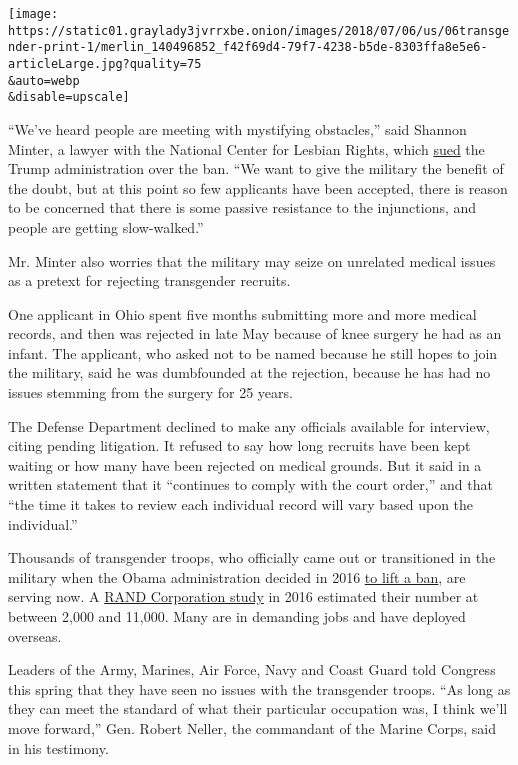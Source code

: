 \texttt{[image: https://static01.graylady3jvrrxbe.onion/images/2018/07/06/us/06transgender-print-1/merlin\_140496852\_f42f69d4-79f7-4238-b5de-8303ffa8e5e6-articleLarge.jpg?quality=75\\\&auto=webp\\\&disable=upscale]}

``We've heard people are meeting with mystifying obstacles,'' said
Shannon Minter, a lawyer with the National Center for Lesbian Rights,
which
\href{https://www.nytimes3xbfgragh.onion/2017/10/30/us/military-transgender-ban.html}{sued}
the Trump administration over the ban. ``We want to give the military
the benefit of the doubt, but at this point so few applicants have been
accepted, there is reason to be concerned that there is some passive
resistance to the injunctions, and people are getting slow-walked.''

Mr. Minter also worries that the military may seize on unrelated medical
issues as a pretext for rejecting transgender recruits.

One applicant in Ohio spent five months submitting more and more medical
records, and then was rejected in late May because of knee surgery he
had as an infant. The applicant, who asked not to be named because he
still hopes to join the military, said he was dumbfounded at the
rejection, because he has had no issues stemming from the surgery for 25
years.

The Defense Department declined to make any officials available for
interview, citing pending litigation. It refused to say how long
recruits have been kept waiting or how many have been rejected on
medical grounds. But it said in a written statement that it ``continues
to comply with the court order,'' and that ``the time it takes to review
each individual record will vary based upon the individual.''

Thousands of transgender troops, who officially came out or transitioned
in the military when the Obama administration decided in 2016
\href{https://www.nytimes3xbfgragh.onion/2016/07/01/us/transgender-military.html}{to
lift a ban}, are serving now. A
\href{https://www.rand.org/pubs/research_reports/RR1530.html}{RAND
Corporation study} in 2016 estimated their number at between 2,000 and
11,000. Many are in demanding jobs and have deployed overseas.

Leaders of the Army, Marines, Air Force, Navy and Coast Guard told
Congress this spring that they have seen no issues with the transgender
troops. ``As long as they can meet the standard of what their particular
occupation was, I think we'll move forward,'' Gen. Robert Neller, the
commandant of the Marine Corps, said in his testimony.

